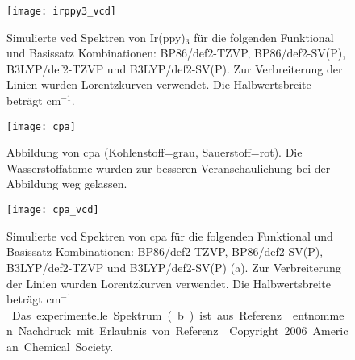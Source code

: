 \begin{figure}[ht!]
	\centering
	\texttt{[image: irppy3\_vcd]}
	\captionsetup{figurewithin = chapter}
	\captionsetup{font=small, labelfont=bf}\caption[Simulierte \ac{vcd} Spektren von Ir(ppy)$_3$]{Simulierte \ac{vcd} Spektren von Ir(ppy)$_3$ für die folgenden Funktional und Basissatz Kombinationen: BP86/def2-TZVP, BP86/def2-SV(P), B3LYP/def2-TZVP und B3LYP/def2-SV(P). Zur Verbreiterung der Linien wurden Lorentzkurven verwendet. Die Halbwertsbreite beträgt \unit[4]{cm$^{-1}$}.}
\label{abb:irppy3_vcd}
\end{figure}

\begin{figure}[ht!]
	\centering
	\texttt{[image: cpa]}
	\captionsetup{figurewithin = chapter}
	\captionsetup{font=small, labelfont=bf}\caption[Abbildung von \ac{cpa}]{Abbildung von \ac{cpa} (Kohlenstoff=grau, Sauerstoff=rot). Die Wasserstoffatome wurden zur besseren Veranschaulichung bei der Abbildung weg gelassen.}
\label{abb:cpa}
\end{figure}

\begin{figure}[ht!]
	\centering
	\texttt{[image: cpa\_vcd]}
	\captionsetup{figurewithin = chapter}
	\captionsetup{font=small, labelfont=bf}\caption[Simulierte \ac{vcd} Spektren von \ac{cpa}]{Simulierte \ac{vcd} Spektren von \ac{cpa} für die folgenden Funktional und Basissatz Kombinationen: BP86/def2-TZVP, BP86/def2-SV(P), B3LYP/def2-TZVP und B3LYP/def2-SV(P) (a). Zur Verbreiterung der Linien wurden Lorentzkurven verwendet. Die Halbwertsbreite beträgt \unit[4]{cm$^{-1}$}. Das experimentelle Spektrum (b) ist aus Referenz \cite{brotin2006vibrational} entnommen. Nachdruck mit Erlaubnis von Referenz \cite{brotin2006vibrational}. Copyright 2006 American Chemical Society.}
\label{abb:cpa_vcd}
\end{figure}

